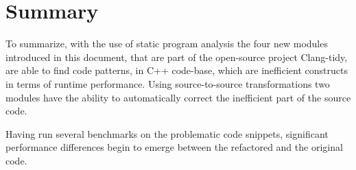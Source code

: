 \section{Summary}
\par To summarize, with the use of static program analysis the four new modules introduced in this document, that are part of the open-source project Clang-tidy, are able to find code patterns, in C++ code-base, which are inefficient constructs in terms of runtime performance. Using source-to-source transformations two modules have the ability to automatically correct the inefficient part of the source code. \medskip
\par Having run several benchmarks on the problematic code snippets, significant performance differences begin to emerge between the refactored and the original code. 
